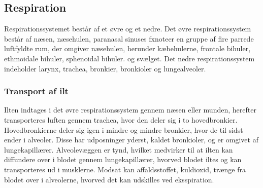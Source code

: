 \subsection{Respiration}
Respirationssystemet består af et øvre og et nedre. Det øvre respirationssystem består af næsen, næsehulen, paranasal sinuses fxnote{er en gruppe af fire parrede luftfyldte rum, der omgiver næsehulen, herunder kæbehulerne, frontale bihuler, ethmoidale bihuler, sphenoidal bihuler.} og svælget. Det nedre respirationssystem indeholder larynx, trachea, bronkier, bronkioler og lungealveoler. \citep{Martini2012, Sand2008}

\subsubsection{Transport af ilt} 
Ilten indtages i det øvre respirationssystem gennem næsen eller munden, herefter transporteres luften gennem trachea, hvor den deler sig i to hovedbronkier. Hovedbronkierne deler sig igen i mindre og mindre bronkier, hvor de til sidst ender i alveoler. Disse har udposninger yderst, kaldet bronkioler, og er omgivet af lungekapillærer.  Alveolevæggen er tynd, hvilket medvirker til at ilten kan diffundere over i blodet gennem lungekapillærer, hvorved blodet iltes og kan transporteres ud i musklerne. Modsat kan affaldsstoffet, kuldioxid, trænge fra blodet over i alveolerne, hvorved det kan udskilles ved eksspiration.\citep{Martini2012, Sand2008}
